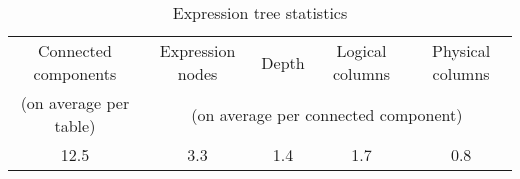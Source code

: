 \begin{table}[!h]
\centering
\begin{tabular}{c|cccc}
Connected components   & Expression nodes & Depth & Logical columns & Physical columns \\
(on average per table) & \multicolumn{4}{c}{(on average per connected component)}  \\ \hline
12.5                   & 3.3              & 1.4   & 1.7           & 0.8           
\end{tabular}
\caption{Expression tree statistics}
\label{tab:eval:results:analysis2}
\end{table}
